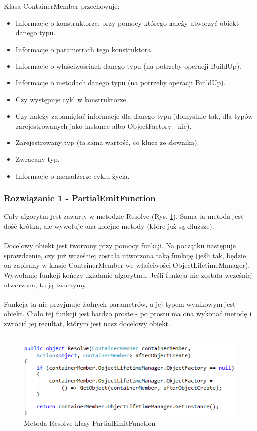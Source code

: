\documentclass[12pt]{article}
\begin{document}
Klasa ContainerMember przechowuje:
\begin{itemize}
	\item Informacje o konstruktorze, przy pomocy którego należy utworzyć obiekt danego typu.
	\item Informacje o parametrach tego konstruktora.
	\item Informacje o właściwościach danego typu (na potrzeby operacji BuildUp).
	\item Informacje o metodach danego typu (na potrzeby operacji BuildUp).
	\item Czy występuje cykl w konstruktorze.
	\item Czy należy zapamiętać informacje dla danego typu (domyślnie tak, dla typów zarejestrowanych jako Instance albo ObjectFactory - nie).
	\item Zarejestrowany typ (ta sama wartość, co klucz ze słownika).
	\item Zwracany typ.
	\item Informacje o menadżerze cyklu życia.
\end{itemize}

\subsubsection{Rozwiązanie 1 - PartialEmitFunction}
Cały algorytm jest zawarty w metodzie Resolve (Rys. \ref{fig:PartialEmitFunction_Resolve}). Sama ta metoda jest dość krótka, ale wywołuje ona kolejne metody (które już są dłuższe).\\
\\
Docelowy obiekt jest tworzony przy pomocy funkcji. Na początku następuje sprawdzenie, czy już wcześniej została utworzona taką funkcję (jeśli tak, będzie on zapisany w klasie ContainerMember we właściwości ObjectLifetimeManager). Wywołanie funkcji kończy działanie algorytmu. Jeśli funkcja nie została wcześniej utworzona, to ją tworzymy.\\
\\
Funkcja ta nie przyjmuje żadnych parametrów, a jej typem wynikowym jest obiekt. Ciało tej funkcji jest bardzo proste - po prostu ma ona wykonać metodę i zwrócić jej rezultat, którym jest nasz docelowy obiekt.\\ \\
\begin{figure}[H]
	\begin{center}
  		\includegraphics{PartialEmitFunction_Resolve.png}
  		\caption{Metoda Resolve klasy PartialEmitFunction}
  		\label{fig:PartialEmitFunction_Resolve}
	\end{center}
\end{figure}
\end{document}
